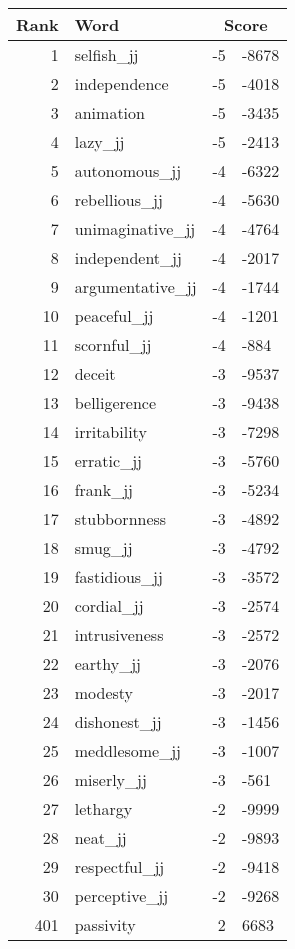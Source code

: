 \begin{longtable}[!htbp]{| rlr@{.}l |}
    \hline
    \textbf{Rank} & \textbf{Word} & \multicolumn{2}{c|}{\textbf{Score}} \\
    \hline
    \endhead
    1 & selfish\_jj & -5 & -8678 \\
    2 & independence & -5 & -4018 \\
    3 & animation & -5 & -3435 \\
    4 & lazy\_jj & -5 & -2413 \\
    5 & autonomous\_jj & -4 & -6322 \\
    6 & rebellious\_jj & -4 & -5630 \\
    7 & unimaginative\_jj & -4 & -4764 \\
    8 & independent\_jj & -4 & -2017 \\
    9 & argumentative\_jj & -4 & -1744 \\
    10 & peaceful\_jj & -4 & -1201 \\
    11 & scornful\_jj & -4 & -884 \\
    12 & deceit & -3 & -9537 \\
    13 & belligerence & -3 & -9438 \\
    14 & irritability & -3 & -7298 \\
    15 & erratic\_jj & -3 & -5760 \\
    16 & frank\_jj & -3 & -5234 \\
    17 & stubbornness & -3 & -4892 \\
    18 & smug\_jj & -3 & -4792 \\
    19 & fastidious\_jj & -3 & -3572 \\
    20 & cordial\_jj & -3 & -2574 \\
    21 & intrusiveness & -3 & -2572 \\
    22 & earthy\_jj & -3 & -2076 \\
    23 & modesty & -3 & -2017 \\
    24 & dishonest\_jj & -3 & -1456 \\
    25 & meddlesome\_jj & -3 & -1007 \\
    26 & miserly\_jj & -3 & -561 \\
    27 & lethargy & -2 & -9999 \\
    28 & neat\_jj & -2 & -9893 \\
    29 & respectful\_jj & -2 & -9418 \\
    30 & perceptive\_jj & -2 & -9268 \\
    401 & passivity & 2 & 6683 \\

\end{longtable}
